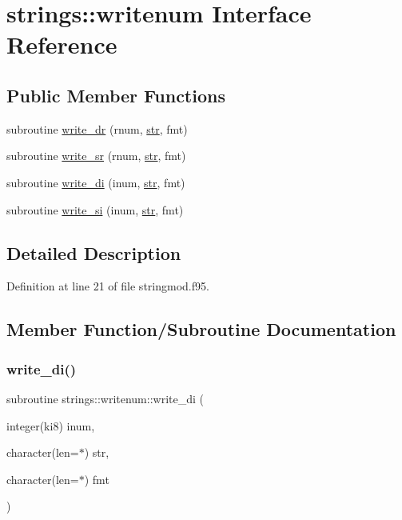 \hypertarget{interfacestrings_1_1writenum}{}\section{strings\+:\+:writenum Interface Reference}
\label{interfacestrings_1_1writenum}
\subsection*{Public Member Functions}
\begin{DoxyCompactItemize}
\item 
subroutine \hyperlink{interfacestrings_1_1writenum_a41519a1d4a27d51318cbdbd6c02ada41}{write\+\_\+dr} (rnum, \hyperlink{_s_o_l_w_e_i_g__misc_8f95_a77a2ca74046c88062aa8333bf1eaca05}{str}, fmt)
\item 
subroutine \hyperlink{interfacestrings_1_1writenum_a057712cfbe8449b5c0f9ccb80a50c68e}{write\+\_\+sr} (rnum, \hyperlink{_s_o_l_w_e_i_g__misc_8f95_a77a2ca74046c88062aa8333bf1eaca05}{str}, fmt)
\item 
subroutine \hyperlink{interfacestrings_1_1writenum_a23cc22768358f32dca2eca631aca318d}{write\+\_\+di} (inum, \hyperlink{_s_o_l_w_e_i_g__misc_8f95_a77a2ca74046c88062aa8333bf1eaca05}{str}, fmt)
\item 
subroutine \hyperlink{interfacestrings_1_1writenum_a7cd46c3fce679fe99b15b5f38cda22c5}{write\+\_\+si} (inum, \hyperlink{_s_o_l_w_e_i_g__misc_8f95_a77a2ca74046c88062aa8333bf1eaca05}{str}, fmt)
\end{DoxyCompactItemize}


\subsection{Detailed Description}


Definition at line 21 of file stringmod.\+f95.



\subsection{Member Function/\+Subroutine Documentation}
\mbox{\label{interfacestrings_1_1writenum_a23cc22768358f32dca2eca631aca318d}} 
\subsubsection{\texorpdfstring{write\+\_\+di()}{write\_di()}}
{\footnotesize\ttfamily subroutine strings\+::writenum\+::write\+\_\+di (\begin{DoxyParamCaption}\item[{integer(ki8)}]{inum,  }\item[{character(len=$\ast$)}]{str,  }\item[{character(len=$\ast$)}]{fmt }\end{DoxyParamCaption})}




